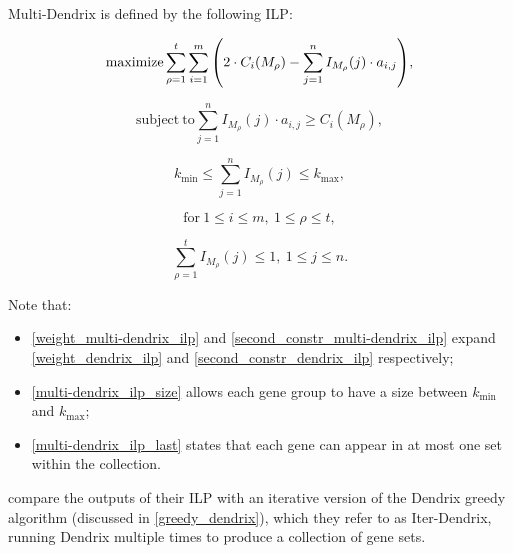 \begin{definition}
    $\mathrm{Multi}$-$\mathrm{Dendrix}$ is defined by the following ILP:

    \begin{equation} \label{weight_multi-dendrix_ilp}
        \mathrm{maximize} \sum_{\rho = 1}^t {\sum_{i = 1}^m {\left(2 \cdot C_i(M_\rho) - \sum_{j = 1}^n I_{M_\rho}(j) \cdot a_{i, j}\right)}},
    \end{equation}

    \begin{equation} \label{second_constr_multi-dendrix_ilp}
        \mathrm{subject \ to} \sum_{j = 1}^n I_{M_\rho}(j) \cdot {a_{i, j}} \ge C_i(M_\rho),
    \end{equation}

    \begin{equation} \label{multi-dendrix_ilp_size}
        k_\mathrm{min} \le \sum_{j = 1}^n {I_{M_\rho}(j)} \le k_\mathrm{max},
    \end{equation}
    
    \begin{equation*}
        \mathrm{for\ } 1 \le i \le m, \ 1 \le \rho \le t,
    \end{equation*}

    \begin{equation} \label{multi-dendrix_ilp_last}
        \sum_{\rho = 1}^t{I_{M_\rho}(j)} \le 1, \ 1 \le j \le n.
    \end{equation}
\end{definition}

Note that:

\begin{itemize}
    \item \cref{weight_multi-dendrix_ilp} and \cref{second_constr_multi-dendrix_ilp} expand \cref{weight_dendrix_ilp} and \cref{second_constr_dendrix_ilp} respectively;
    \item \cref{multi-dendrix_ilp_size} allows each gene group to have a size between $k_\mathrm{min}$ and $k_\mathrm{max}$;
    \item \cref{multi-dendrix_ilp_last} states that each gene can appear in at most one set within the collection. 
\end{itemize}

\textcite{multi-dendrix} compare the outputs of their ILP with an iterative version of the Dendrix greedy algorithm (discussed in \cref{greedy_dendrix}), which they refer to as Iter-Dendrix, running Dendrix multiple times to produce a collection of gene sets.

